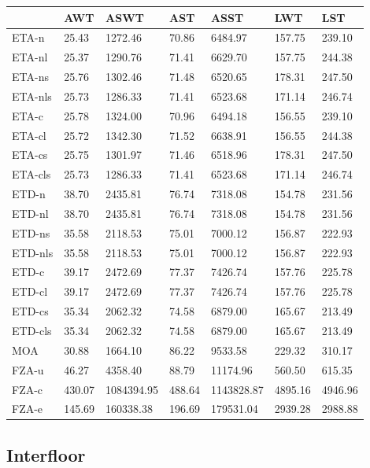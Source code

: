 \documentclass{UoYCSproject}
\begin{document}
\begin{tabular}{l | l l l l l l}
	& AWT & ASWT & AST & ASST & LWT & LST \\
	\hline
	ETA-n & 25.43 & 1272.46 & 70.86 & 6484.97 & 157.75 & 239.10 \\
	ETA-nl & 25.37 & 1290.76 & 71.41 & 6629.70 & 157.75 & 244.38 \\
	ETA-ns & 25.76 & 1302.46 & 71.48 & 6520.65 & 178.31 & 247.50 \\
	ETA-nls & 25.73 & 1286.33 & 71.41 & 6523.68 & 171.14 & 246.74 \\
	ETA-c & 25.78 & 1324.00 & 70.96 & 6494.18 & 156.55 & 239.10 \\
	ETA-cl & 25.72 & 1342.30 & 71.52 & 6638.91 & 156.55 & 244.38 \\
	ETA-cs & 25.75 & 1301.97 & 71.46 & 6518.96 & 178.31 & 247.50 \\
	ETA-cls & 25.73 & 1286.33 & 71.41 & 6523.68 & 171.14 & 246.74 \\
	\hline
	ETD-n & 38.70 & 2435.81 & 76.74 & 7318.08 & 154.78 & 231.56 \\
	ETD-nl & 38.70 & 2435.81 & 76.74 & 7318.08 & 154.78 & 231.56 \\
	ETD-ns & 35.58 & 2118.53 & 75.01 & 7000.12 & 156.87 & 222.93 \\
	ETD-nls & 35.58 & 2118.53 & 75.01 & 7000.12 & 156.87 & 222.93 \\
	ETD-c & 39.17 & 2472.69 & 77.37 & 7426.74 & 157.76 & 225.78 \\
	ETD-cl & 39.17 & 2472.69 & 77.37 & 7426.74 & 157.76 & 225.78 \\
	ETD-cs & 35.34 & 2062.32 & 74.58 & 6879.00 & 165.67 & 213.49 \\
	ETD-cls & 35.34 & 2062.32 & 74.58 & 6879.00 & 165.67 & 213.49 \\
	\hline
	MOA & 30.88 & 1664.10 & 86.22 & 9533.58 & 229.32 & 310.17 \\
	\hline
	FZA-u & 46.27 & 4358.40 & 88.79 & 11174.96 & 560.50 & 615.35 \\
	FZA-c & 430.07 & 1084394.95 & 488.64 & 1143828.87 & 4895.16 & 4946.96 \\
	FZA-e & 145.69 & 160338.38 & 196.69 & 179531.04 & 2939.28 & 2988.88
\end{tabular}

\subsection{Interfloor}
\end{document}
